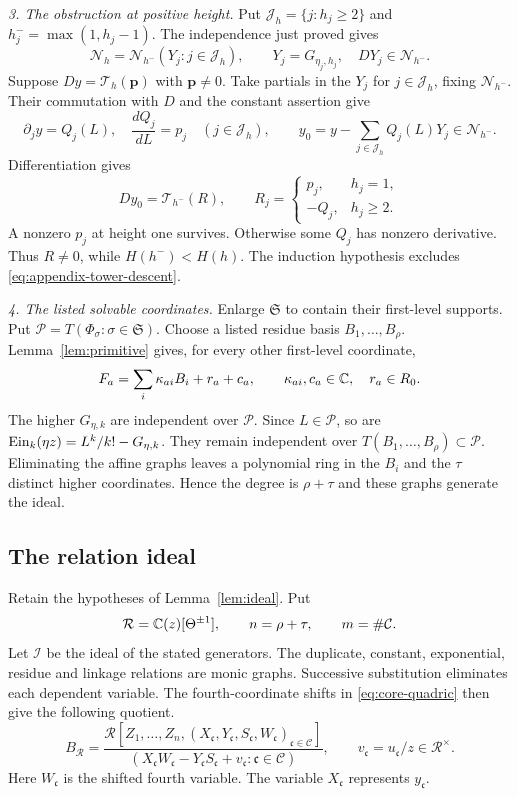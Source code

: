 \emph{3. The obstruction at positive height.}
Put $\mathcal J_h=\{j:h_j\ge2\}$ and $h^-_j=\max(1,h_j-1)$.
The independence just proved gives
\[
 \mathcal N_h=\mathcal N_{h^-}(Y_j:j\in\mathcal J_h),\qquad
 Y_j=G_{\eta_j,h_j},\quad DY_j\in\mathcal N_{h^-}.
\]
Suppose $Dy=\mathcal T_h(\mathbf p)$ with $\mathbf p\ne0$.
Take partials in the $Y_j$ for $j\in\mathcal J_h$, fixing $\mathcal N_{h^-}$.
Their commutation with $D$ and the constant assertion give
\[
 \partial_jy=Q_j(L),\quad \frac{dQ_j}{dL}=p_j
 \quad(j\in\mathcal J_h),\qquad
 y_0=y-\sum_{j\in\mathcal J_h}Q_j(L)Y_j\in\mathcal N_{h^-}.
\]
Differentiation gives
\begin{equation}\label{eq:appendix-tower-descent}
 Dy_0=\mathcal T_{h^-}(R),\qquad
 R_j=\begin{cases}
 p_j,&h_j=1,\\
 -Q_j,&h_j\ge2.
 \end{cases}
\end{equation}
A nonzero $p_j$ at height one survives.
Otherwise some $Q_j$ has nonzero derivative.
Thus $R\ne0$, while $H(h^-)<H(h)$.
The induction hypothesis excludes \eqref{eq:appendix-tower-descent}.

\emph{4. The listed solvable coordinates.}
Enlarge $\mathfrak S$ to contain their first-level supports.
Put $\mathcal P=T(\Phi_\sigma:\sigma\in\mathfrak S)$.
Choose a listed residue basis $B_1,\ldots,B_\rho$.
Lemma~\ref{lem:primitive} gives, for every other first-level coordinate,
\[
 F_a=\sum_i\kappa_{ai}B_i+r_a+c_a,\qquad
 \kappa_{ai},c_a\in\mathbb{C},\quad r_a\in R_0.
\]
The higher $G_{\eta,k}$ are independent over $\mathcal P$.
Since $L\in\mathcal P$, so are $\operatorname{Ein}_k(\eta z)=L^k/k!-G_{\eta,k}$.
They remain independent over $T(B_1,\ldots,B_\rho)\subset\mathcal P$.
Eliminating the affine graphs leaves a polynomial ring in the $B_i$
and the $\tau$ distinct higher coordinates.
Hence the degree is $\rho+\tau$ and these graphs generate the ideal.


\subsection{The relation ideal}\label{app:ideal-details}
Retain the hypotheses of Lemma~\ref{lem:ideal}.
Put
\[
 \mathcal R=\mathbb{C}(z)[\Theta^{\pm1}],\qquad n=\rho+\tau,
 \qquad m=\#\mathcal C.
\]
Let $\mathcal I$ be the ideal of the stated generators.
The duplicate, constant, exponential, residue and linkage relations
are monic graphs. Successive substitution eliminates each dependent
variable. The fourth-coordinate shifts in \eqref{eq:core-quadric}
then give the following quotient.
\begin{equation}\label{eq:app-ideal-model}
 B_{\mathcal R}=
 \frac{\mathcal R[Z_1,\ldots,Z_n,(X_{\mathfrak c},Y_{\mathfrak c},
 S_{\mathfrak c},W_{\mathfrak c})_{\mathfrak c\in\mathcal C}]}
 {(X_{\mathfrak c}W_{\mathfrak c}-Y_{\mathfrak c}S_{\mathfrak c}
       +v_{\mathfrak c}:\mathfrak c\in\mathcal C)},
 \qquad v_{\mathfrak c}=u_{\mathfrak c}/z\in\mathcal R^\times.
\end{equation}
Here $W_{\mathfrak c}$ is the shifted fourth variable.
The variable $X_{\mathfrak c}$ represents $y_{\mathfrak c}$.

